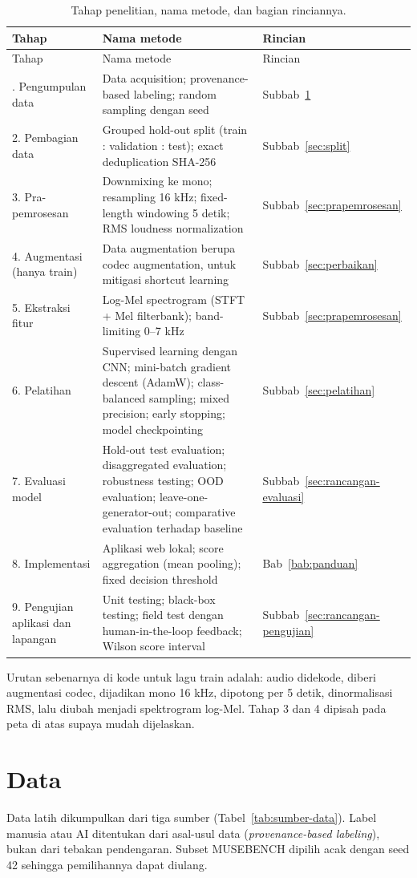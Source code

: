 {\singlespacing\small
\begin{longtable}{L{3.1cm} L{7.0cm} L{2.0cm}}
\caption{Tahap penelitian, nama metode, dan bagian rinciannya.}\label{tab:peta-metode}\\
\toprule
Tahap & Nama metode & Rincian\\
\midrule
\endfirsthead
\toprule
Tahap & Nama metode & Rincian\\
\midrule
\endhead
\bottomrule
{}. Pengumpulan data & Data acquisition; provenance-based labeling; random sampling dengan seed & Subbab~\ref{sec:data}\\
2. Pembagian data & Grouped hold-out split (train : validation : test); exact deduplication SHA-256 & Subbab~\ref{sec:split}\\
3. Pra-pemrosesan & Downmixing ke mono; resampling 16 kHz; fixed-length windowing 5 detik; RMS loudness normalization & Subbab~\ref{sec:prapemrosesan}\\
4. Augmentasi (hanya train) & Data augmentation berupa codec augmentation, untuk mitigasi shortcut learning & Subbab~\ref{sec:perbaikan}\\
5. Ekstraksi fitur & Log-Mel spectrogram (STFT + Mel filterbank); band-limiting 0--7 kHz & Subbab~\ref{sec:prapemrosesan}\\
6. Pelatihan & Supervised learning dengan CNN; mini-batch gradient descent (AdamW); class-balanced sampling; mixed precision; early stopping; model checkpointing & Subbab~\ref{sec:pelatihan}\\
7. Evaluasi model & Hold-out test evaluation; disaggregated evaluation; robustness testing; OOD evaluation; leave-one-generator-out; comparative evaluation terhadap baseline & Subbab~\ref{sec:rancangan-evaluasi}\\
8. Implementasi & Aplikasi web lokal; score aggregation (mean pooling); fixed decision threshold & Bab~\ref{bab:panduan}\\
9. Pengujian aplikasi dan lapangan & Unit testing; black-box testing; field test dengan human-in-the-loop feedback; Wilson score interval & Subbab~\ref{sec:rancangan-pengujian}\\
\end{longtable}}

Urutan sebenarnya di kode untuk lagu train adalah: audio didekode, diberi augmentasi codec, dijadikan mono 16 kHz, dipotong per 5 detik, dinormalisasi RMS, lalu diubah menjadi spektrogram log-Mel. Tahap 3 dan 4 dipisah pada peta di atas supaya mudah dijelaskan.

\section{Data}\label{sec:data}
Data latih dikumpulkan dari tiga sumber (Tabel~\ref{tab:sumber-data}). Label manusia atau AI ditentukan dari asal-usul data (\textit{provenance-based labeling}), bukan dari tebakan pendengaran. Subset MUSEBENCH dipilih acak dengan seed 42 sehingga pemilihannya dapat diulang.

